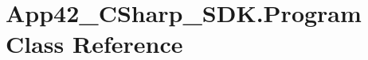 \hypertarget{class_app42___c_sharp___s_d_k_1_1_program}{\section{App42\+\_\+\+C\+Sharp\+\_\+\+S\+D\+K.\+Program Class Reference}
\label{class_app42___c_sharp___s_d_k_1_1_program}
}
